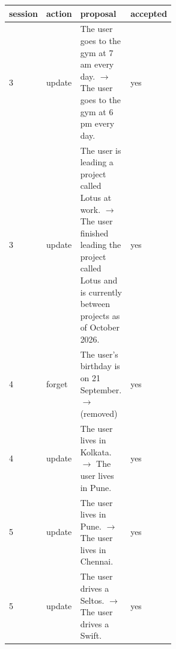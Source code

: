 \begin{tabular}{llp{0.55\linewidth}l}
\toprule
session & action & proposal & accepted \\
\midrule
3 & update & The user goes to the gym at 7 am every day. $\rightarrow$ The user goes to the gym at 6 pm every day. & yes \\
3 & update & The user is leading a project called Lotus at work. $\rightarrow$ The user finished leading the project called Lotus and is currently between projects as of October 2026. & yes \\
4 & forget & The user's birthday is on 21 September. $\rightarrow$ (removed) & yes \\
4 & update & The user lives in Kolkata. $\rightarrow$ The user lives in Pune. & yes \\
5 & update & The user lives in Pune. $\rightarrow$ The user lives in Chennai. & yes \\
5 & update & The user drives a Seltos. $\rightarrow$ The user drives a Swift. & yes \\
\bottomrule
\end{tabular}
